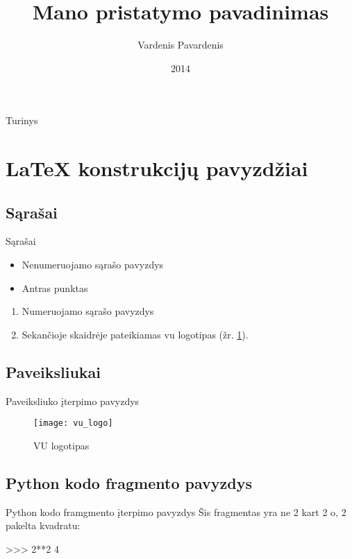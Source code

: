 \documentclass{beamer}
\title{Mano pristatymo pavadinimas}
\author{Vardenis Pavardenis}
\institute[Vilniaus Universitetas]
{
  \inst{1}%
  Matematikos ir informatikos institutas\\
  Vilniaus universitetas
}
\date{2014}
\begin{document}
\begin{frame}
  \titlepage
\end{frame}

\begin{frame}{Turinys}
  \tableofcontents
\end{frame}

\section{LaTeX konstrukcijų pavyzdžiai}
\subsection{Sąrašai}
\begin{frame}{Sąrašai}
\begin{itemize}
    \item Nenumeruojamo sąrašo pavyzdys
    \item Antras punktas
\end{itemize}

\begin{enumerate}
    \item Numeruojamo sąrašo pavyzdys
    \item Sekančioje skaidrėje pateikiamas vu logotipas (žr. \ref{fig:vu logo}).
\end{enumerate}
\end{frame}

\subsection{Paveiksliukai}
\begin{frame}{Paveiksliuko įterpimo pavyzdys}
\begin{figure}[!htbp]
    \texttt{[image: vu\_logo]}
    \label{fig:vu logo}

    \caption{VU logotipas}
\end{figure}
\end{frame}

\subsection{Python kodo fragmento pavyzdys}
\begin{frame}[fragile]{Python kodo framgmento įterpimo pavyzdys}
Šis fragmentas yra ne 2 kart 2 o, 2 pakelta kvadratu:
\begin{python}
>>> 2**2
4
\end{python}
\end{frame}
\end{document}
